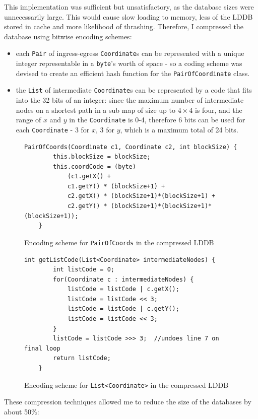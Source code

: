 \documentclass[12pt,notitlepage]{report}
\begin{document}
\noindent
This implementation was sufficient but unsatisfactory, as the database sizes were unnecessarily large. This would cause slow loading to memory, less of the LDDB stored in cache and more likelihood of thrashing. Therefore, I compressed the database using bitwise encoding schemes:
\begin{itemize}
\item each {\tt Pair} of ingress-egress {\tt Coordinate}s can be represented with a unique integer representable in a {\tt byte}'s worth of space - so a coding scheme was devised to create an efficient hash function for the {\tt PairOfCoordinate} class.
\item the {\tt List} of intermediate {\tt Coordinate}s can be represented by a code that fits into the 32 bits of an integer: since the maximum number of intermediate nodes on a shortest path in a sub map of size up to {$4 \times 4$} is four\footnotemark[2], and the range of $x$ and $y$ in the {\tt Coordinate} is 0-4, therefore 6 bits can be used for each {\tt Coordinate} - 3 for $x$, 3 for $y$, which is a maximum total of 24 bits.
\end{itemize}

\begin{figure}
\begin{lstlisting}
PairOfCoords(Coordinate c1, Coordinate c2, int blockSize) {
		this.blockSize = blockSize;
		this.coordCode = (byte) 
			(c1.getX() + 
			c1.getY() * (blockSize+1) + 
			c2.getX() * (blockSize+1)*(blockSize+1) + 
			c2.getY() * (blockSize+1)*(blockSize+1)*(blockSize+1));
	}
\end{lstlisting}
\caption{Encoding scheme for {\tt PairOfCoords} in the compressed LDDB}
\end{figure}

\begin{figure}
\begin{lstlisting}
int getListCode(List<Coordinate> intermediateNodes) {
		int listCode = 0;
		for(Coordinate c : intermediateNodes) {
			listCode = listCode | c.getX();
			listCode = listCode << 3;
			listCode = listCode | c.getY();
			listCode = listCode << 3;
		}
		listCode = listCode >>> 3;	//undoes line 7 on final loop
		return listCode;
	}
\end{lstlisting}
\caption{Encoding scheme for {\tt List<Coordinate>} in the compressed LDDB}
\end{figure}

\noindent
These compression techniques allowed me to reduce the size of the databases by about 50\%:
\end{document}
